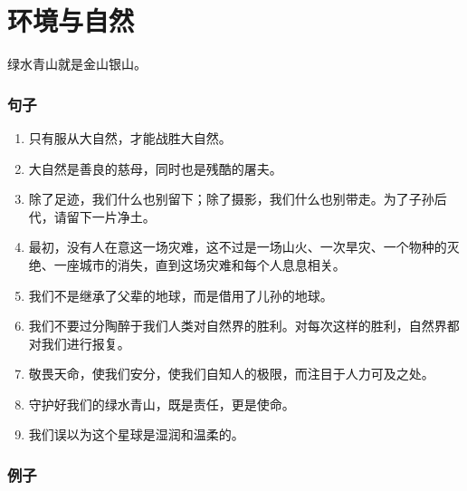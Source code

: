 \chapter{环境与自然}
绿水青山就是金山银山。
\subsection{句子}
\begin{enumerate}
\item 只有服从大自然，才能战胜大自然。
\item 大自然是善良的慈母，同时也是残酷的屠夫。
\item 除了足迹，我们什么也别留下；除了摄影，我们什么也别带走。为了子孙后代，请留下一片净土。
\item 最初，没有人在意这一场灾难，这不过是一场山火、一次旱灾、一个物种的灭绝、一座城市的消失，直到这场灾难和每个人息息相关。
\item 我们不是继承了父辈的地球，而是借用了儿孙的地球。
\item 我们不要过分陶醉于我们人类对自然界的胜利。对每次这样的胜利，自然界都对我们进行报复。
\item 敬畏天命，使我们安分，使我们自知人的极限，而注目于人力可及之处。
\item 守护好我们的绿水青山，既是责任，更是使命。
\item 我们误以为这个星球是湿润和温柔的。
\end{enumerate}
\subsection{例子}

